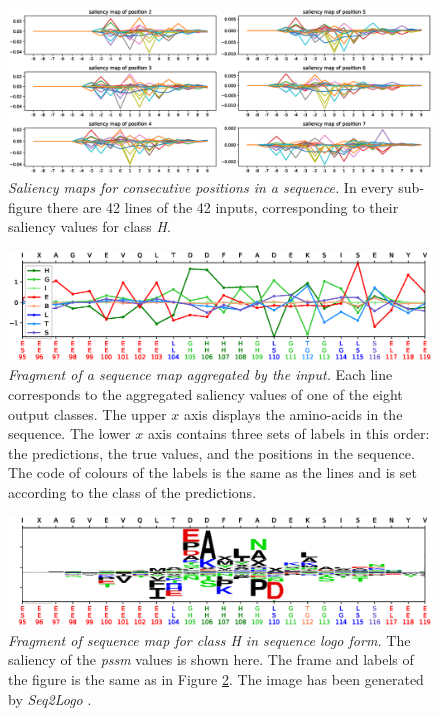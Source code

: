 \begin{figure}
	\centering
	\includegraphics[width=1\linewidth]{Figures/sliding}
	\caption{\textit{Saliency maps for consecutive positions in a sequence.} In every sub-figure there are 42 lines of the 42 inputs, corresponding to their saliency values for class \textit{H}.}
	\label{fig:sliding}
\end{figure}


\begin{figure}
	\centering
	\includegraphics[width=1\linewidth]{Figures/sample_8classes}
	\caption{\textit{Fragment of a sequence map aggregated by the input.} Each line corresponds to the aggregated saliency values of one of the eight output classes. The upper $x$ axis displays the amino-acids in the sequence. The lower $x$ axis contains three sets of labels in this order: the predictions, the true values, and the positions in the sequence. The code of colours of the labels is the same as the lines and is set according to the class of the predictions.}
	\label{fig:sample_8classes}
\end{figure}

\begin{figure}
	\centering
	\includegraphics[width=1\linewidth]{Figures/sample_Hclass}
	\caption{\textit{Fragment of sequence map for class H in sequence logo form.} The saliency of the \textit{pssm} values is shown here. The frame and labels of the figure is the same as in Figure \ref{fig:sample_8classes}. The image has been generated by \textit{Seq2Logo} \cite{Thomsen2012}.}
	\label{fig:sample_Hclass}
\end{figure}


